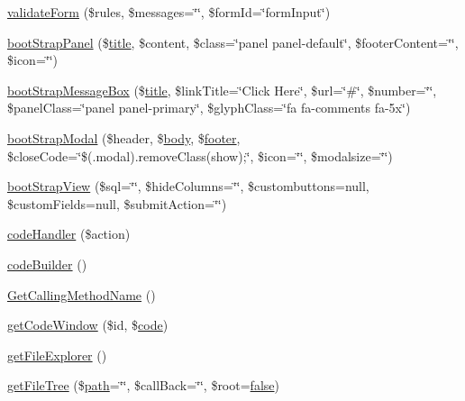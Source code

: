 \begin{DoxyCompactItemize}
\item 
\hyperlink{classCody_ad923b413da151f230932758e98530a7f}{validate\+Form} (\$rules, \$messages=\char`\"{}\char`\"{}, \$form\+Id=\char`\"{}form\+Input\char`\"{})
\item 
\hyperlink{classCody_a286ac4c282deba8991d57ce83f43a07f}{boot\+Strap\+Panel} (\$\hyperlink{Shape_8php_ad264ad0cabbe965bf7f7c8a5ed6abebb}{title}, \$content, \$class=\char`\"{}panel panel-\/default\char`\"{}, \$footer\+Content=\char`\"{}\char`\"{}, \$icon=\char`\"{}\char`\"{})
\item 
\hyperlink{classCody_a5eaecf702f81ad0cee70cad3a7f9bcfa}{boot\+Strap\+Message\+Box} (\$\hyperlink{Shape_8php_ad264ad0cabbe965bf7f7c8a5ed6abebb}{title}, \$link\+Title=\char`\"{}Click Here\char`\"{}, \$url=\char`\"{}\#\char`\"{}, \$number=\char`\"{}\char`\"{}, \$panel\+Class=\char`\"{}panel panel-\/primary\char`\"{}, \$glyph\+Class=\char`\"{}fa fa-\/comments fa-\/5x\char`\"{})
\item 
\hyperlink{classCody_a60d6b062da92824ee778cd1666e31c23}{boot\+Strap\+Modal} (\$header, \$\hyperlink{Shape_8php_a88c61c5f59a3f950b502f07325de2f87}{body}, \$\hyperlink{Shape_8php_ae5058e5b790e8cea2dd33c1c9bbcbbd4}{footer}, \$close\+Code=\char`\"{}\$(\textquotesingle{}.modal\textquotesingle{}).remove\+Class(\textquotesingle{}show\textquotesingle{});\char`\"{}, \$icon=\char`\"{}\char`\"{}, \$modalsize=\char`\"{}\char`\"{})
\item 
\hyperlink{classCody_a8518bcc95441b4c3e7fbae070c0402fb}{boot\+Strap\+View} (\$sql=\char`\"{}\char`\"{}, \$hide\+Columns=\char`\"{}\char`\"{}, \$custombuttons=null, \$custom\+Fields=null, \$submit\+Action=\char`\"{}\char`\"{})
\item 
\hyperlink{classCody_a9d96d2252b6a5ae82ebeeb6fffcfdb58}{code\+Handler} (\$action)
\item 
\hyperlink{classCody_a993ccef820ff205c9a96511a473ff9f7}{code\+Builder} ()
\item 
\hyperlink{classCody_a2aa1fc0af17ec69cc1a909e6646debb4}{Get\+Calling\+Method\+Name} ()
\item 
\hyperlink{classCody_a4b33bd3c589058703a35914506890293}{get\+Code\+Window} (\$id, \$\hyperlink{Shape_8php_ab09356b52e00cf46f1ee5be7344c9139}{code})
\item 
\hyperlink{classCody_a5737b5a18b58d98dc4a6f8ebc9053d3b}{get\+File\+Explorer} ()
\item 
\hyperlink{classCody_aff64a768f79ea2641d2a1ac1b5a976a5}{get\+File\+Tree} (\$\hyperlink{Shape_8php_a3b05eec13add53df44e232273d718ae4}{path}=\char`\"{}\char`\"{}, \$call\+Back=\char`\"{}\char`\"{}, \$root=\hyperlink{tina4_8php_aec2deb5590a84bee262c3bea206ae88f}{false})

\end{DoxyCompactItemize}
